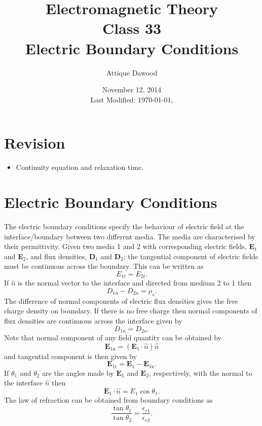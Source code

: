 \documentclass[12pt,a4paper]{article}
\title{Electromagnetic Theory\\Class 33\\Electric Boundary Conditions}
\author{Attique Dawood}
\date{November 12, 2014\\[0.2cm] Last Modified: \today, \currenttime}
\begin{document}
\maketitle
\section{Revision}
\begin{itemize}
\item Continuity equation and relaxation time.
\end{itemize}
\section{Electric Boundary Conditions}
The electric boundary conditions specify the behaviour of electric field at the interface/boundary between two different media. The media are characterised by their permittivity. Given two media 1 and 2 with corresponding electric fields, \textbf{E}$_1$ and \textbf{E}$_2$, and flux densities, \textbf{D}$_1$ and \textbf{D}$_2$; the tangential component of electric fields must be continuous across the boundary. This can be written as
\begin{equation}
E_{1t}=E_{2t}.
\end{equation}
If $\hat n$ is the normal vector to the interface and directed from medium 2 to 1 then
\begin{equation}
D_{1n}-D_{2n}=\rho_s.
\end{equation}
The difference of normal components of electric flux densities gives the free charge density on boundary. If there is no free charge then normal components of flux densities are continuous across the interface given by
\begin{equation}
D_{1n}=D_{2n}.
\end{equation}
Note that normal component of any field quantity can be obtained by
\begin{equation}
\mathrm{\textbf{E$_{1n}$}}=(\mathrm{\textbf {E$_1$}}\cdot\hat n)\hat n
\end{equation}
and tangential component is then given by
\begin{equation}
\mathrm{\textbf{E$_{1t}$}}=\mathrm{\textbf{E$_{1}$}}-\mathrm{\textbf{E$_{1n}$}}.
\end{equation}
If $\theta_1$ and $\theta_2$ are the angles made by $\mathrm{\textbf{E$_{1}$}}$ and $\mathrm{\textbf{E$_{2}$}}$, respectively, with the normal to the interface $\hat n$ then
\begin{equation}
\mathrm{\textbf{E$_{1}$}}\cdot\hat n=E_1\cos\theta_1.
\end{equation}
The law of refraction can be obtained from boundary conditions as
\begin{equation}
\dfrac{\tan\theta_1}{\tan\theta_2}=\dfrac{\epsilon_{r1}}{\epsilon_{r2}}.
\end{equation}
\end{document}
